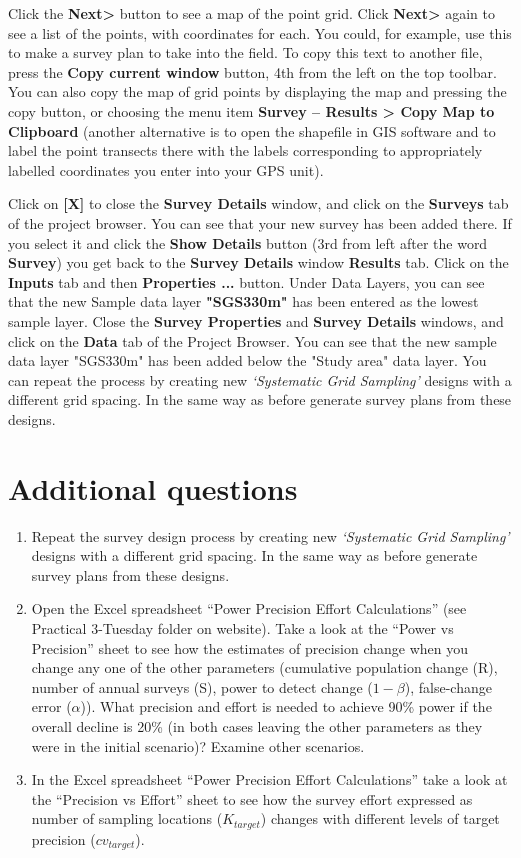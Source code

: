 \documentclass[a4paper, 10pt]{article}
\begin{document}
Click the \textbf{Next>} button to see a map of the point grid. Click \textbf{Next>} again to see a list of the points, with coordinates for each. You could, for example, use this to make a survey plan to take into the field. To copy this text to another file, press the \textbf{Copy current window} button, 4th from the left on the top toolbar. You can also copy the map of grid points by displaying the map and pressing the copy button, or choosing the menu item \textbf{Survey – Results > Copy Map to Clipboard} (another alternative is to open the shapefile in GIS software and to label the point transects there with the labels corresponding to appropriately labelled coordinates you enter into your GPS unit).

Click on \textbf{[X]} to close the \textbf{Survey Details} window, and click on the \textbf{Surveys} tab of the project browser. You can see that your new survey has been added there. If you select it and click the \textbf{Show Details} button (3rd from left after the word \textbf{Survey}) you get back to the \textbf{Survey Details} window \textbf{Results} tab. Click on the \textbf{Inputs} tab and then \textbf{Properties ...} button. Under Data Layers, you can see that the new Sample data layer \textbf{"SGS330m"} has been entered as the lowest sample layer. Close the \textbf{Survey Properties} and \textbf{Survey Details} windows, and click on the \textbf{Data} tab of the Project Browser. You can see that the new sample data layer "SGS330m" has been added below the "Study area" data layer. You can repeat the process by creating new \emph{‘Systematic Grid Sampling’} designs with a different grid spacing. In the same way as before generate survey plans from these designs. 

\section{Additional questions}

\begin{enumerate}
 	\item Repeat the survey design process by creating new \emph{‘Systematic Grid Sampling’} designs with a different grid spacing. In the same way as before generate survey plans from these designs.
 \item Open the Excel spreadsheet “Power Precision Effort Calculations” (see Practical 3-Tuesday folder on website). Take a look at the “Power vs Precision” sheet to see how the estimates of precision change when you change any one of the other parameters (cumulative population change (R), number of annual surveys (S), power to detect change ($1-\beta$), false-change error ($\alpha$)). What precision and effort is needed to achieve 90\% power if the overall decline is 20\% (in both cases leaving the other parameters as they were in the initial scenario)? Examine other scenarios.
\item In the Excel spreadsheet “Power Precision Effort Calculations” take a look at the “Precision vs Effort” sheet to see how the survey effort expressed as number of sampling locations ($K_{target}$) changes with different levels of target precision ($cv_{target}$). 
\end{enumerate}
\end{document}
